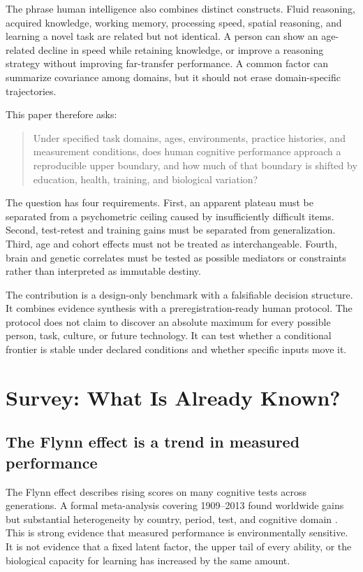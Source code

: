 \documentclass[conference]{IEEEtran}
\begin{document}
The phrase human intelligence also combines distinct constructs. Fluid reasoning, acquired knowledge, working memory, processing speed, spatial reasoning, and learning a novel task are related but not identical. A person can show an age-related decline in speed while retaining knowledge, or improve a reasoning strategy without improving far-transfer performance. A common factor can summarize covariance among domains, but it should not erase domain-specific trajectories.

This paper therefore asks:
\begin{quote}
Under specified task domains, ages, environments, practice histories, and measurement conditions, does human cognitive performance approach a reproducible upper boundary, and how much of that boundary is shifted by education, health, training, and biological variation?
\end{quote}

The question has four requirements. First, an apparent plateau must be separated from a psychometric ceiling caused by insufficiently difficult items. Second, test-retest and training gains must be separated from generalization. Third, age and cohort effects must not be treated as interchangeable. Fourth, brain and genetic correlates must be tested as possible mediators or constraints rather than interpreted as immutable destiny.

The contribution is a design-only benchmark with a falsifiable decision structure. It combines evidence synthesis with a preregistration-ready human protocol. The protocol does not claim to discover an absolute maximum for every possible person, task, culture, or future technology. It can test whether a conditional frontier is stable under declared conditions and whether specific inputs move it.

\section{Survey: What Is Already Known?}
\label{sec:survey}

\subsection{The Flynn effect is a trend in measured performance}
The Flynn effect describes rising scores on many cognitive tests across generations. A formal meta-analysis covering 1909--2013 found worldwide gains but substantial heterogeneity by country, period, test, and cognitive domain \cite{pietschnig2015}. This is strong evidence that measured performance is environmentally sensitive. It is not evidence that a fixed latent factor, the upper tail of every ability, or the biological capacity for learning has increased by the same amount.
\end{document}

